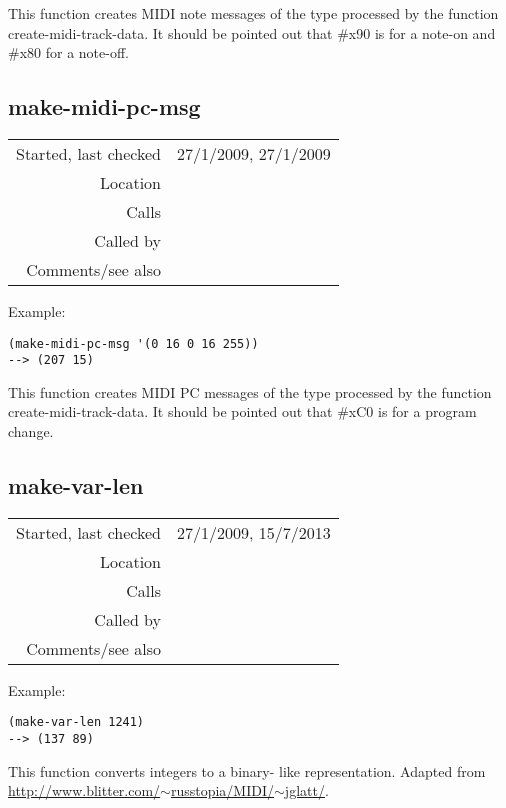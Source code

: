\noindent This function creates MIDI note messages of
the type processed by the function
create-midi-track-data. It should be pointed out that
\#x90 is for a note-on and \#x80 for a note-off.


\subsection*{make-midi-pc-msg}\label{fun:make-midi-pc-msg}

\vspace{0.3cm}
\begin{tabular}{r|p{8cm}}
Started, last checked & 27/1/2009, 27/1/2009 \\
Location & \nameref{sec:MIDI-export} \\
Calls & \\
Called by & \nameref{fun:create-midi-events} \\
Comments/see also &
\end{tabular}

\vspace{0.5cm}
\noindent Example:
\begin{verbatim}
(make-midi-pc-msg '(0 16 0 16 255))
--> (207 15)
\end{verbatim}

\noindent This function creates MIDI PC messages of
the type processed by the function
create-midi-track-data. It should be pointed out that
\#xC0 is for a program change.


\subsection*{make-var-len}\label{fun:make-var-len}

\vspace{0.3cm}
\begin{tabular}{r|p{8cm}}
Started, last checked & 27/1/2009, 15/7/2013 \\
Location & \nameref{sec:MIDI-export} \\
Calls & \\
Called by & \nameref{fun:create-midi-track-data} \\
Comments/see also &
\end{tabular}

\vspace{0.5cm}
\noindent Example:
\begin{verbatim}
(make-var-len 1241)
--> (137 89)
\end{verbatim}

\noindent This function converts integers to a binary-
like representation. Adapted from \href{http://www.blitter.com/~russtopia/MIDI/~jglatt/}{http://www.blitter.com/$\sim$russtopia/MIDI/$\sim$jglatt/}.


